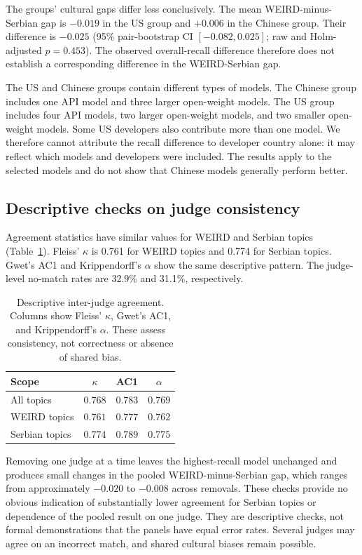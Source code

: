 \documentclass[11pt,a4paper]{article}
\begin{document}
The groups' cultural gaps differ less conclusively. The mean WEIRD-minus-Serbian gap is $-0.019$ in the US group and $+0.006$ in the Chinese group. Their difference is $-0.025$ (95\% pair-bootstrap CI $[-0.082,0.025]$; raw and Holm-adjusted $p=0.453$). The observed overall-recall difference therefore does not establish a corresponding difference in the WEIRD-Serbian gap.

The US and Chinese groups contain different types of models. The Chinese group includes one API model and three larger open-weight models. The US group includes four API models, two larger open-weight models, and two smaller open-weight models. Some US developers also contribute more than one model. We therefore cannot attribute the recall difference to developer country alone: it may reflect which models and developers were included. The results apply to the selected models and do not show that Chinese models generally perform better.

\subsection{Descriptive checks on judge consistency}
\label{sec:judge-checks}
Agreement statistics have similar values for WEIRD and Serbian topics (Table~\ref{tab:judge-checks}). Fleiss' $\kappa$ is 0.761 for WEIRD topics and 0.774 for Serbian topics. Gwet's AC1 and Krippendorff's $\alpha$ show the same descriptive pattern. The judge-level no-match rates are 32.9\% and 31.1\%, respectively.

\begin{table}[!htbp]
\centering
\small
\caption{Descriptive inter-judge agreement. Columns show Fleiss' $\kappa$, Gwet's AC1, and Krippendorff's $\alpha$. These assess consistency, not correctness or absence of shared bias.}
\label{tab:judge-checks}
\begin{tabular*}{\columnwidth}{@{\extracolsep{\fill}}lccc@{}}
\toprule
Scope & $\kappa$ & AC1 & $\alpha$\\
\midrule
All topics & $0.768$ & $0.783$ & $0.769$\\
WEIRD topics & $0.761$ & $0.777$ & $0.762$\\
Serbian topics & $0.774$ & $0.789$ & $0.775$\\
\bottomrule
\end{tabular*}
\end{table}

Removing one judge at a time leaves the highest-recall model unchanged and produces small changes in the pooled WEIRD-minus-Serbian gap, which ranges from approximately $-0.020$ to $-0.008$ across removals. These checks provide no obvious indication of substantially lower agreement for Serbian topics or dependence of the pooled result on one judge. They are descriptive checks, not formal demonstrations that the panels have equal error rates. Several judges may agree on an incorrect match, and shared cultural biases remain possible.
\end{document}
